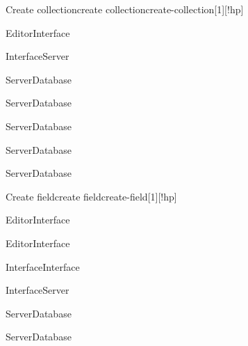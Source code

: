 \begin{sdfig}{Create collection}{create collection}{create-collection}[1][!hp]

  \begin{seqdigauth}[Editor]
    \begin{umlcall}[op={Create collection},return=Ok]{Editor}{Interface}
      \begin{umlcall}[op={Create collection},return=Ok]{Interface}{Server}
        \begin{umlcall}[op={Create collection}]{Server}{Database}
        \end{umlcall}
        \begin{umlcall}[op={Create field}]{Server}{Database}
        \end{umlcall}
        \begin{umlcall}[op={Create view}]{Server}{Database}
        \end{umlcall}
        \begin{umlcall}[op={Create document}]{Server}{Database}
        \end{umlcall}
        \begin{umlcall}[op={Create block}]{Server}{Database}
        \end{umlcall}
      \end{umlcall}
    \end{umlcall}
  \end{seqdigauth}
\end{sdfig}


\begin{sdfig}{Create field}{create field}{create-field}[1][!hp]

  \begin{seqdigauth}[Editor]
    \begin{umlcall}[op={Create field}]{Editor}{Interface}
    \end{umlcall}

    \begin{umlcall}[op={Select type},return=Ok]{Editor}{Interface}
      \begin{umlcall}[op={Update local state}]{Interface}{Interface}
      \end{umlcall}
      \begin{umlcall}[op={Create field},return=Ok]{Interface}{Server}
        \begin{umlcall}[op={Create field}]{Server}{Database}
        \end{umlcall}
        \begin{umlcall}[op={Create blocks}]{Server}{Database}
        \end{umlcall}
      \end{umlcall}
    \end{umlcall}
  \end{seqdigauth}
\end{sdfig}

